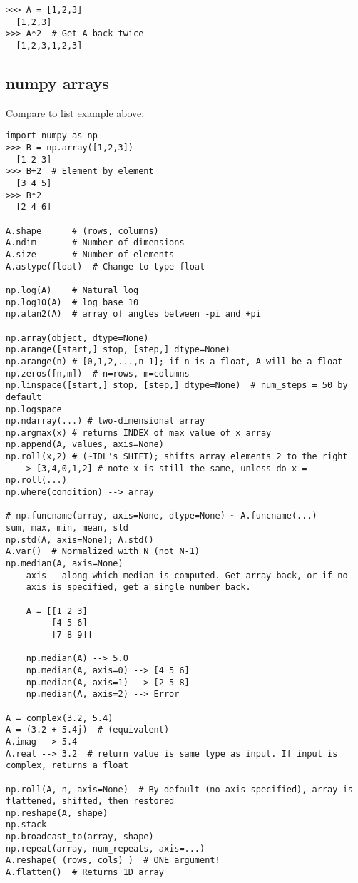 \documentclass{article}
\begin{document}
\begin{multicols}{2}
\begin{lstlisting}
>>> A = [1,2,3]
  [1,2,3]
>>> A*2  # Get A back twice
  [1,2,3,1,2,3]
\end{lstlisting}

\subsection{numpy arrays}
Compare to list example above:
\begin{lstlisting}
import numpy as np
>>> B = np.array([1,2,3])
  [1 2 3]
>>> B+2  # Element by element
  [3 4 5]
>>> B*2
  [2 4 6]

A.shape      # (rows, columns)
A.ndim       # Number of dimensions
A.size       # Number of elements
A.astype(float)  # Change to type float

np.log(A)    # Natural log
np.log10(A)  # log base 10
np.atan2(A)  # array of angles between -pi and +pi

np.array(object, dtype=None)
np.arange([start,] stop, [step,] dtype=None)
np.arange(n) # [0,1,2,...,n-1]; if n is a float, A will be a float
np.zeros([n,m])  # n=rows, m=columns
np.linspace([start,] stop, [step,] dtype=None)  # num_steps = 50 by default
np.logspace
np.ndarray(...) # two-dimensional array
np.argmax(x) # returns INDEX of max value of x array
np.append(A, values, axis=None)
np.roll(x,2) # (~IDL's SHIFT); shifts array elements 2 to the right
  --> [3,4,0,1,2] # note x is still the same, unless do x = np.roll(...)
np.where(condition) --> array

# np.funcname(array, axis=None, dtype=None) ~ A.funcname(...)
sum, max, min, mean, std
np.std(A, axis=None); A.std()
A.var()  # Normalized with N (not N-1)
np.median(A, axis=None)
    axis - along which median is computed. Get array back, or if no
    axis is specified, get a single number back.

    A = [[1 2 3]
         [4 5 6]
         [7 8 9]]

    np.median(A) --> 5.0
    np.median(A, axis=0) --> [4 5 6]
    np.median(A, axis=1) --> [2 5 8]
    np.median(A, axis=2) --> Error

A = complex(3.2, 5.4)
A = (3.2 + 5.4j)  # (equivalent)
A.imag --> 5.4
A.real --> 3.2  # return value is same type as input. If input is complex, returns a float

np.roll(A, n, axis=None)  # By default (no axis specified), array is flattened, shifted, then restored
np.reshape(A, shape)
np.stack
np.broadcast_to(array, shape)
np.repeat(array, num_repeats, axis=...)
A.reshape( (rows, cols) )  # ONE argument!
A.flatten()  # Returns 1D array


\end{lstlisting}
\end{multicols}
\end{document}
